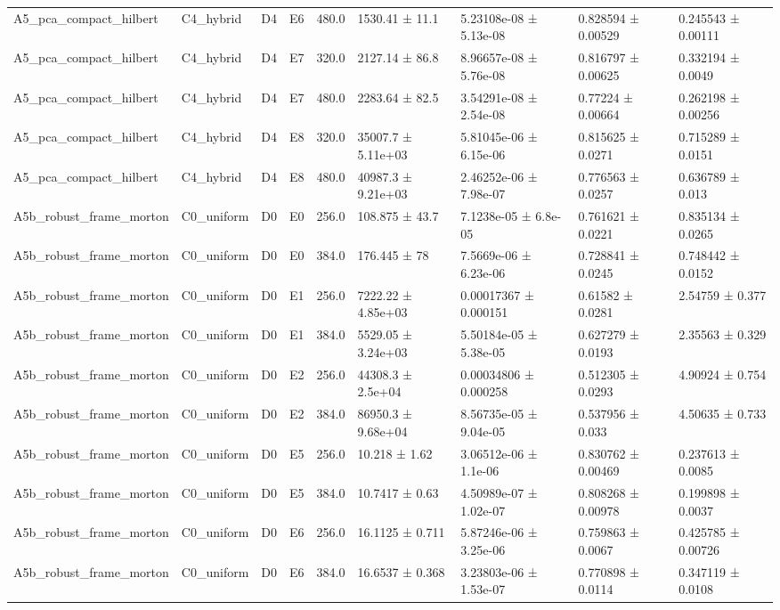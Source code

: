 \begin{table}
\begin{tabular}{lllllllll}
A5\_pca\_compact\_hilbert & C4\_hybrid & D4 & E6 & 480.0 & 1530.41 ± 11.1 & 5.23108e-08 ± 5.13e-08 & 0.828594 ± 0.00529 & 0.245543 ± 0.00111 \\
A5\_pca\_compact\_hilbert & C4\_hybrid & D4 & E7 & 320.0 & 2127.14 ± 86.8 & 8.96657e-08 ± 5.76e-08 & 0.816797 ± 0.00625 & 0.332194 ± 0.0049 \\
A5\_pca\_compact\_hilbert & C4\_hybrid & D4 & E7 & 480.0 & 2283.64 ± 82.5 & 3.54291e-08 ± 2.54e-08 & 0.77224 ± 0.00664 & 0.262198 ± 0.00256 \\
A5\_pca\_compact\_hilbert & C4\_hybrid & D4 & E8 & 320.0 & 35007.7 ± 5.11e+03 & 5.81045e-06 ± 6.15e-06 & 0.815625 ± 0.0271 & 0.715289 ± 0.0151 \\
A5\_pca\_compact\_hilbert & C4\_hybrid & D4 & E8 & 480.0 & 40987.3 ± 9.21e+03 & 2.46252e-06 ± 7.98e-07 & 0.776563 ± 0.0257 & 0.636789 ± 0.013 \\
A5b\_robust\_frame\_morton & C0\_uniform & D0 & E0 & 256.0 & 108.875 ± 43.7 & 7.1238e-05 ± 6.8e-05 & 0.761621 ± 0.0221 & 0.835134 ± 0.0265 \\
A5b\_robust\_frame\_morton & C0\_uniform & D0 & E0 & 384.0 & 176.445 ± 78 & 7.5669e-06 ± 6.23e-06 & 0.728841 ± 0.0245 & 0.748442 ± 0.0152 \\
A5b\_robust\_frame\_morton & C0\_uniform & D0 & E1 & 256.0 & 7222.22 ± 4.85e+03 & 0.00017367 ± 0.000151 & 0.61582 ± 0.0281 & 2.54759 ± 0.377 \\
A5b\_robust\_frame\_morton & C0\_uniform & D0 & E1 & 384.0 & 5529.05 ± 3.24e+03 & 5.50184e-05 ± 5.38e-05 & 0.627279 ± 0.0193 & 2.35563 ± 0.329 \\
A5b\_robust\_frame\_morton & C0\_uniform & D0 & E2 & 256.0 & 44308.3 ± 2.5e+04 & 0.00034806 ± 0.000258 & 0.512305 ± 0.0293 & 4.90924 ± 0.754 \\
A5b\_robust\_frame\_morton & C0\_uniform & D0 & E2 & 384.0 & 86950.3 ± 9.68e+04 & 8.56735e-05 ± 9.04e-05 & 0.537956 ± 0.033 & 4.50635 ± 0.733 \\
A5b\_robust\_frame\_morton & C0\_uniform & D0 & E5 & 256.0 & 10.218 ± 1.62 & 3.06512e-06 ± 1.1e-06 & 0.830762 ± 0.00469 & 0.237613 ± 0.0085 \\
A5b\_robust\_frame\_morton & C0\_uniform & D0 & E5 & 384.0 & 10.7417 ± 0.63 & 4.50989e-07 ± 1.02e-07 & 0.808268 ± 0.00978 & 0.199898 ± 0.0037 \\
A5b\_robust\_frame\_morton & C0\_uniform & D0 & E6 & 256.0 & 16.1125 ± 0.711 & 5.87246e-06 ± 3.25e-06 & 0.759863 ± 0.0067 & 0.425785 ± 0.00726 \\
A5b\_robust\_frame\_morton & C0\_uniform & D0 & E6 & 384.0 & 16.6537 ± 0.368 & 3.23803e-06 ± 1.53e-07 & 0.770898 ± 0.0114 & 0.347119 ± 0.0108 \\

\end{tabular}
\end{table}
